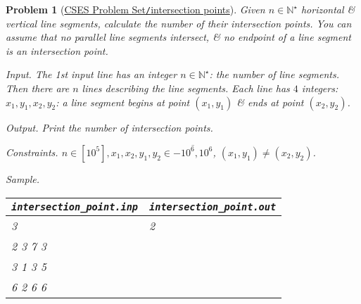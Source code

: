 \documentclass{article}
\newtheorem{problem}{Problem}
\begin{document}
\begin{problem}[\href{https://cses.fi/problemset/task/1740}{CSES Problem Set{\tt/}intersection points}]
    Given $n\in\mathbb{N}^\star$ horizontal \& vertical line segments, calculate the number of their intersection points. You can assume that no parallel line segments intersect, \& no endpoint of a line segment is an intersection point.
    \item {\sf Input.} The 1st input line has an integer $n\in\mathbb{N}^\star$: the number of line segments. Then there are $n$ lines describing the line segments. Each line has $4$ integers: $x_1,y_1,x_2,y_2$: a line segment begins at point $(x_1,y_1)$ \& ends at point $(x_2,y_2)$.
    \item {\sf Output.} Print the number of intersection points.
    \item {\sf Constraints.} $n\in[10^5],x_1,x_2,y_1,y_2\in\overline{-10^6,10^6}$, $(x_1,y_1)\ne(x_2,y_2)$.
    \item {\sf Sample.}
    \begin{table}[H]
        \centering
        \begin{tabular}{|l|l|}
            \hline
            \verb|intersection_point.inp| & \verb|intersection_point.out| \\
            \hline
            3 & 2 \\
            2 3 7 3 & \\
            3 1 3 5 & \\
            6 2 6 6 & \\
            \hline
        \end{tabular}
    \end{table}
\end{problem}
\end{document}

